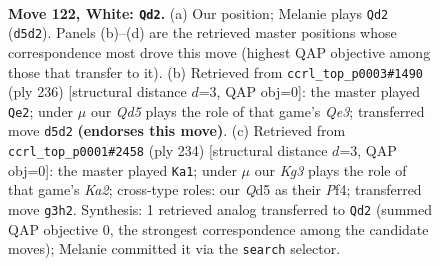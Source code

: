 \documentclass[11pt]{article}
\begin{document}
\begin{figure}[p]\centering
\begin{subfigure}{0.46\textwidth}\centering
\resizebox{\linewidth}{!}{%
\newchessgame
\chessboard[
  setfen={4k3/8/8/3Q4/8/6K1/8/8 w - - 23 122},
  showmover=false,
  pgfstyle=straightmove, color=movearrow, markmove={d5-d2}
]}
\caption{}
\end{subfigure}\hfill
\begin{subfigure}{0.46\textwidth}\centering
\resizebox{\linewidth}{!}{%
\newchessgame
\chessboard[
  setfen={8/1r6/3K4/8/k7/4Q3/8/8 w - - 13 119},
  showmover=false,
  pgfstyle=straightmove, color=movearrow, markmove={e3-e2}
]}
\caption{}
\end{subfigure}
\\[4pt]
\begin{subfigure}{0.46\textwidth}\centering
\resizebox{\linewidth}{!}{%
\newchessgame
\chessboard[
  setfen={8/8/8/8/1k3P2/8/K7/8 w - - 6 118},
  showmover=false,
  pgfstyle=straightmove, color=movearrow, markmove={a2-a1}
]}
\caption{}
\end{subfigure}\hfill

\caption{\textbf{Move 122, White: \texttt{Qd2}.} (a) Our position; Melanie plays \texttt{Qd2} (\texttt{d5d2}). Panels (b)--(d) are the retrieved master positions whose correspondence most drove this move (highest QAP objective among those that transfer to it). (b) Retrieved from \texttt{ccrl\_top\_p0003\#1490} (ply 236) [structural distance $d$=3, QAP obj=0]: the master played \texttt{Qe2}; under $\mu$ our \emph{Qd5} plays the role of that game's \emph{Qe3}; transferred move \texttt{d5d2} \textbf{(endorses this move)}. (c) Retrieved from \texttt{ccrl\_top\_p0001\#2458} (ply 234) [structural distance $d$=3, QAP obj=0]: the master played \texttt{Ka1}; under $\mu$ our \emph{Kg3} plays the role of that game's \emph{Ka2}; cross-type roles: our \emph{Q}d5 as their \emph{P}f4; transferred move \texttt{g3h2}. Synthesis: 1 retrieved analog transferred to \texttt{Qd2} (summed QAP objective 0, the strongest correspondence among the candidate moves); Melanie committed it via the \texttt{search} selector.}
\label{fig:thought-m242}
\end{figure}

\clearpage
\end{document}
